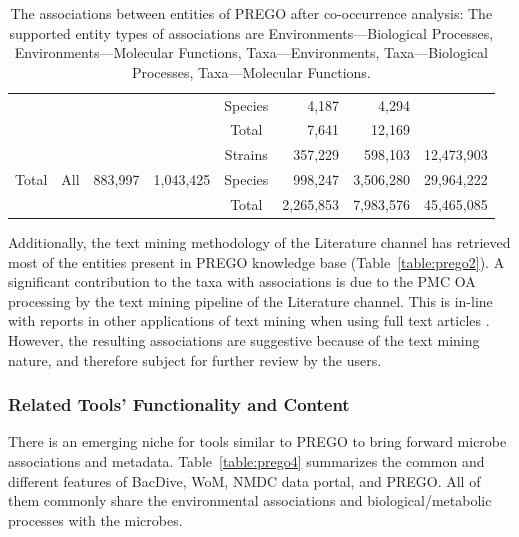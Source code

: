 {\begin{table}
\begin{tabular}{@{}cccccrcr@{}}
      &  &  &  & Species & 4,187 & \multicolumn{1}{r}{4,294} & \multicolumn{1}{l}{} \\
      &  &  &  & Total & 7,641 & \multicolumn{1}{r}{12,169} & \multicolumn{1}{l}{} \\
      \multirow{3}{*}{Total} & \multirow{3}{*}{All} & \multirow{3}{*}{883,997} & \multirow{3}{*}{1,043,425} & Strains & 357,229 & \multicolumn{1}{r}{598,103} & 12,473,903 \\
      &  &  &  & Species & 998,247 & \multicolumn{1}{r}{3,506,280} & 29,964,222 \\
      &  &  &  & Total & 2,265,853 & \multicolumn{1}{r}{7,983,576} & 45,465,085 \\ \cmidrule(l){5-8} 
      \end{tabular}
      \caption[Associations among the PREGO entities]{
         The associations between entities of PREGO after co-occurrence analysis: The supported entity types of associations are Environments—Biological Processes, Environments—Molecular Functions, Taxa—Environments, Taxa—Biological Processes, Taxa—Molecular Functions.
      }
      \label{table:prego3}
   \end{table}

   Additionally, the text mining methodology of the Literature channel has retrieved most of the entities present in PREGO knowledge base (Table~\ref{table:prego2}). 
   A significant contribution to the taxa with associations is due to the PMC OA processing by the text mining pipeline of the Literature channel. 
   This is in-line with reports in other applications of text mining when using full text articles \citep{westergaard2018comprehensive}. 
   However, the resulting associations are suggestive because of the text mining nature, and therefore subject for further review by the users.


   \subsubsection*{Related Tools' Functionality and Content}
   \label{subsec:prego-similar-platforms}

   There is an emerging niche for tools similar to PREGO to bring forward microbe associations and metadata. 
   Table~\ref{table:prego4} summarizes the common and different features of BacDive, WoM, NMDC data portal, and PREGO. 
   All of them commonly share the environmental associations and biological/metabolic processes with the microbes.

}
